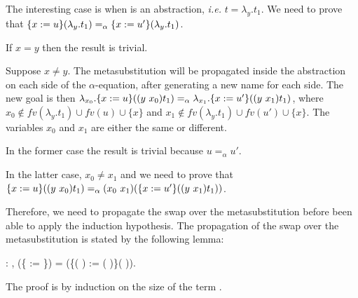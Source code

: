 \begin{coqdoccode}
\end{coqdoccode}
The interesting case is when  is an abstraction, {\it i.e.} $t = \lambda_y.t_1$. We need to prove that $\metasub{(\lambda_y.t_1)}{x}{u} =_\alpha \metasub{(\lambda_y.t_1)}{x}{u'}$.
\begin{coqdoccode}
\end{coqdoccode}
If $x = y$ then the result is trivial.
\begin{coqdoccode}
\end{coqdoccode}
Suppose $x \neq y$. The metasubstitution will be propagated inside the abstraction on each side of the $\alpha$-equation, after generating a new name for each side. The new goal is then $\lambda_{x_0}.\metasub{(\swap{y}{x_0}{t_1})}{x}{u} =_\alpha \lambda_{x_1}.\metasub{(\swap{y}{x_1}{t_1})}{x}{u'}$, where $x_0 \notin fv(\lambda_y.t_1) \cup fv(u) \cup \{x\}$ and $x_1 \notin fv(\lambda_y.t_1) \cup fv(u') \cup \{x\}$. The variables $x_0$ and $x_1$ are either the same or different.
\begin{coqdoccode}
\end{coqdoccode}
In the former case the result is trivial because $u =_\alpha u'$. 
\begin{coqdoccode}
\end{coqdoccode}
In the latter case, $x_0 \neq x_1$ and we need to prove that $\metasub{(\swap{y}{x_0}{t_1})}{x}{u} =_\alpha \swap{x_0}{x_1}{(\metasub{(\swap{y}{x_1}{t_1})}{x}{u'})}$.
\begin{coqdoccode}
\end{coqdoccode}
Therefore, we need to propagate the swap over the metasubstitution before been able to apply the induction hypothesis. The propagation of the swap over the metasubstitution is stated by the following lemma: \newline
\begin{coqdoccode}
\coqdocnoindent
{} : \coqdockw{\ensuremath{\forall}}     ,    (\{ := \}) = (\{(   ) := (   )\}(   )).\coqdoceol
\end{coqdoccode}
 The proof is by induction on the size of the term .
\begin{coqdoccode}
\end{coqdoccode}
